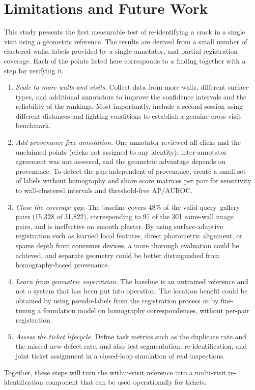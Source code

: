 \section{Limitations and Future Work}
\label{sec:limitations}

This study presents the first measurable test of re-identifying a crack in a single visit using a geometric reference.
The results are derived from a small number of clustered walls, labels provided by a single annotator, and partial registration coverage.
Each of the points listed here corresponds to a finding together with a step for verifying it.
\begin{enumerate}
\item \textit{Scale to more walls and visits.}
Collect data from more walls, different surface types, and additional annotators to improve the confidence intervals and the reliability of the rankings.
Most importantly, include a second session using different distances and lighting conditions to establish a genuine cross-visit benchmark.
\item \textit{Add provenance-free annotation.}
One annotator reviewed all clicks and the unclaimed points (clicks not assigned to any identity); inter-annotator agreement was not assessed, and the geometric advantage depends on provenance.
To detect the gap independent of provenance, create a small set of labels without homography and share score matrices per pair for sensitivity to wall-clustered intervals and threshold-free AP/AUROC.
\item \textit{Close the coverage gap.}
The baseline covers 48\% of the valid query--gallery pairs (15,328 of 31,822), corresponding to 97 of the 301 same-wall image pairs, and is ineffective on smooth plaster.
By using surface-adaptive registration such as learned local features, direct photometric alignment, or sparse depth from consumer devices, a more thorough evaluation could be achieved, and separate geometry could be better distinguished from homography-based provenance.
\item \textit{Learn from geometric supervision.}
The baseline is an untrained reference and not a system that has been put into operation.
The location benefit could be obtained by using pseudo-labels from the registration process or by fine-tuning a foundation model on homography correspondences, without per-pair registration.
\item \textit{Assess the ticket lifecycle.}
Define task metrics such as the duplicate rate and the missed-new-defect rate, and also test segmentation, re-identification, and joint ticket assignment in a closed-loop simulation of real inspections.
\end{enumerate}
Together, these steps will turn the within-visit reference into a multi-visit re-identification component that can be used operationally for tickets.

